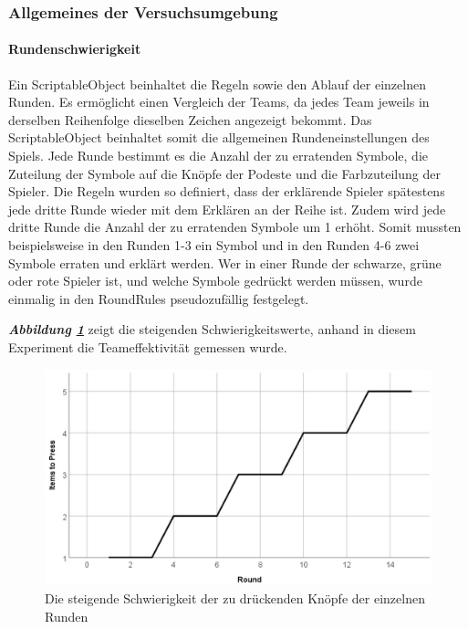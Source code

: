 \documentclass[a4paper,11pt]{article}%
\renewcommand{\\}{\vspace*{0.5\baselineskip} \newline}
\begin{document}
\subsubsection{Allgemeines der Versuchsumgebung}

\paragraph{Rundenschwierigkeit}
Ein ScriptableObject beinhaltet die Regeln sowie den Ablauf der einzelnen Runden. Es ermöglicht einen Vergleich der Teams, da jedes Team jeweils in derselben Reihenfolge dieselben Zeichen angezeigt bekommt. Das ScriptableObject beinhaltet somit die allgemeinen Rundeneinstellungen des Spiels. Jede Runde bestimmt es die Anzahl der zu erratenden Symbole, die Zuteilung der Symbole auf die Knöpfe der Podeste und die Farbzuteilung der Spieler. Die Regeln wurden so definiert, dass der erklärende Spieler spätestens jede dritte Runde wieder mit dem Erklären an der Reihe ist. Zudem wird jede dritte Runde die Anzahl der zu erratenden Symbole um 1 erhöht. Somit mussten beispielsweise in den Runden 1-3 ein Symbol und in den Runden 4-6 zwei Symbole erraten und erklärt werden. Wer in einer Runde der schwarze, grüne oder rote Spieler ist, und welche Symbole gedrückt werden müssen, wurde einmalig in den RoundRules pseudozufällig festgelegt.

\textbf{\textit{Abbildung \ref{RoundDifficulty}}} zeigt die steigenden Schwierigkeitswerte, anhand in diesem Experiment die Teameffektivität gemessen wurde.

\begin{figure}[H]
		\begin{footnotesize}
		\centering
			\includegraphics[scale=0.4]{Abbildungen/RoundDifficulty.JPG}	
			\caption[Die Schwierigkeit der Runden]{Die steigende Schwierigkeit der zu drückenden Knöpfe der einzelnen Runden}
			\label{RoundDifficulty}
		\end{footnotesize}
	\end{figure}
\end{document}
